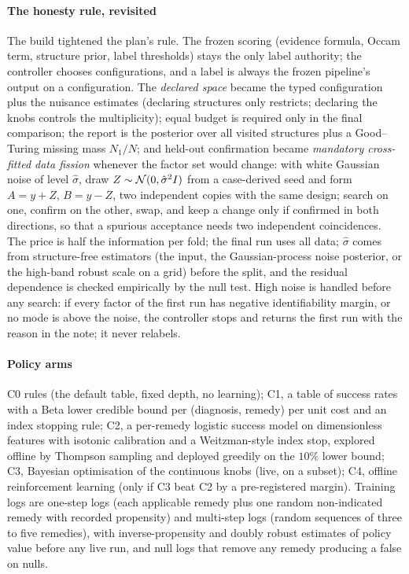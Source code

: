 \paragraph{The honesty rule, revisited} The build tightened the plan's rule. The frozen scoring (evidence formula, Occam term, structure prior, label thresholds) stays the only label authority; the controller chooses configurations, and a label is always the frozen pipeline's output on a configuration.
The \emph{declared space} became the typed configuration plus the nuisance estimates (declaring structures only restricts; declaring the knobs controls the multiplicity); equal budget is required only in the final comparison; the report is the posterior over all visited structures plus a Good--Turing missing mass $N_1/N$;
and held-out confirmation became \emph{mandatory cross-fitted data fission} whenever the factor set would change: with white Gaussian noise of level $\hat\sigma$, draw $Z\sim\mathcal{N}(0,\hat\sigma^2I)$ from a case-derived seed and form $A=y+Z$, $B=y-Z$, two independent copies with the same design; search on one, confirm on the other, swap, and keep a change only if confirmed in both directions, so that a spurious acceptance needs two independent coincidences.
The price is half the information per fold; the final run uses all data; $\hat\sigma$ comes from structure-free estimators (the input, the Gaussian-process noise posterior, or the high-band robust scale on a grid) before the split, and the residual dependence is checked empirically by the null test. High noise is handled before any search: if every factor of the first run has negative identifiability margin, or no mode is above the noise, the controller stops and returns the first run with the reason in the note; it never relabels.

\paragraph{Policy arms} C0 rules (the default table, fixed depth, no learning); C1, a table of success rates with a Beta lower credible bound per (diagnosis, remedy) per unit cost and an index stopping rule; C2, a per-remedy logistic success model on dimensionless features with isotonic calibration and a Weitzman-style index stop, explored offline by Thompson sampling and deployed greedily on the $10\%$ lower bound;
C3, Bayesian optimisation of the continuous knobs (live, on a subset); C4, offline reinforcement learning (only if C3 beat C2 by a pre-registered margin). Training logs are one-step logs (each applicable remedy plus one random non-indicated remedy with recorded propensity) and multi-step logs (random sequences of three to five remedies), with inverse-propensity and doubly robust estimates of policy value before any live run, and null logs that remove any remedy producing a false \FC{} on nulls.

